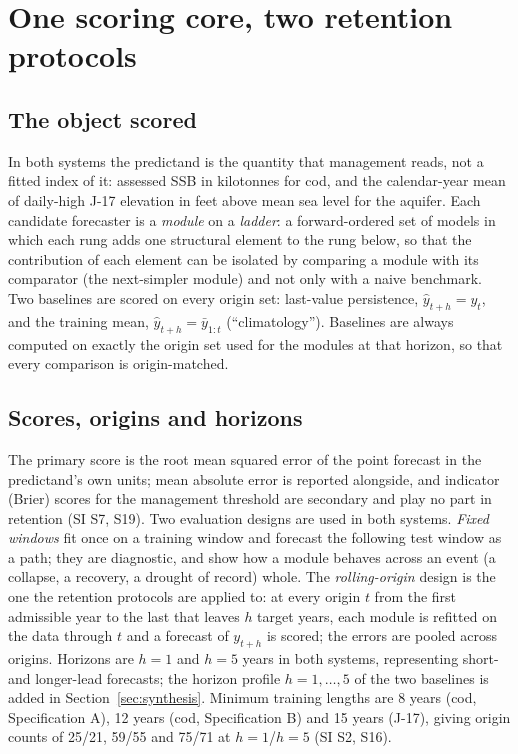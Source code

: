 \section{One scoring core, two retention protocols}\label{sec:design}

\subsection{The object scored}\label{sec:object}

In both systems the predictand is the quantity that management reads, not a fitted index of it: assessed SSB in kilotonnes for cod, and the calendar-year mean of daily-high J-17 elevation in feet above mean sea level for the aquifer. Each candidate forecaster is a \emph{module} on a \emph{ladder}: a forward-ordered set of models in which each rung adds one structural element to the rung below, so that the contribution of each element can be isolated by comparing a module with its comparator (the next-simpler module) and not only with a naive benchmark. Two baselines are scored on every origin set: last-value persistence, $\hat y_{t+h}=y_t$, and the training mean, $\hat y_{t+h}=\bar y_{1:t}$ (``climatology''). Baselines are always computed on exactly the origin set used for the modules at that horizon, so that every comparison is origin-matched.

\subsection{Scores, origins and horizons}\label{sec:scores}

The primary score is the root mean squared error of the point forecast in the predictand's own units; mean absolute error is reported alongside, and indicator (Brier) scores for the management threshold are secondary and play no part in retention (SI S7, S19). Two evaluation designs are used in both systems. \emph{Fixed windows} fit once on a training window and forecast the following test window as a path; they are diagnostic, and show how a module behaves across an event (a collapse, a recovery, a drought of record) whole. The \emph{rolling-origin} design \citep{Tashman2000} is the one the retention protocols are applied to: at every origin $t$ from the first admissible year to the last that leaves $h$ target years, each module is refitted on the data through $t$ and a forecast of $y_{t+h}$ is scored; the errors are pooled across origins. Horizons are $h=1$ and $h=5$ years in both systems, representing short- and longer-lead forecasts; the horizon profile $h=1,\dots,5$ of the two baselines is added in Section~\ref{sec:synthesis}. Minimum training lengths are 8 years (cod, Specification A), 12 years (cod, Specification B) and 15 years (J-17), giving origin counts of 25/21, 59/55 and 75/71 at $h=1$/$h=5$ (SI S2, S16).

